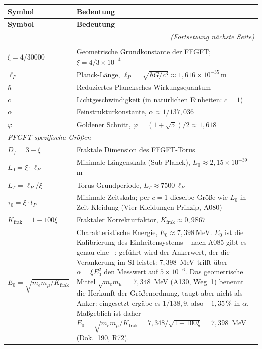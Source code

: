 \renewcommand{\arraystretch}{1.3}
{\small\setlength\tabcolsep{5pt}
\begin{longtable}{lp{\dimexpr\textwidth-3.2cm\relax}}
\toprule
\textbf{Symbol} & \textbf{Bedeutung} \\
\midrule
\endfirsthead
\toprule
\textbf{Symbol} & \textbf{Bedeutung} \\
\midrule
\endhead
\midrule
\multicolumn{2}{r}{\textit{(Fortsetzung nächste Seite)}} \\
\endfoot
\bottomrule
\endlastfoot
\multicolumn{2}{l}{\textit{Fundamentale Konstanten und Parameter}} \\
$\xi = 4/30000$ & Geometrische Grundkonstante der FFGFT;
  $\xi = 4/3\times10^{-4}$ \\
$\ell_P$ & Planck-Länge, $\ell_P = \sqrt{\hbar G/c^3}
  \approx 1{,}616\times10^{-35}\,$m \\
$\hbar$ & Reduziertes Plancksches Wirkungsquantum \\
$c$ & Lichtgeschwindigkeit (in natürlichen Einheiten: $c=1$) \\
$\alpha$ & Feinstrukturkonstante, $\alpha\approx1/137{,}036$ \\
$\varphi$ & Goldener Schnitt, $\varphi=(1+\sqrt5)/2\approx1{,}618$ \\
\midrule
\multicolumn{2}{l}{\textit{FFGFT-spezifische Größen}} \\
$D_f = 3-\xi$ & Fraktale Dimension des FFGFT-Torus \\
$L_0 = \xi\cdot\ell_P$ & Minimale Längenskala (Sub-Planck),
  $L_0\approx2{,}15\times10^{-39}\,$m \\
$L_T = \ell_P/\xi$ & Torus-Grundperiode, $L_T\approx7500\,\ell_P$ \\
$\tau_0 = \xi\cdot t_P$ & Minimale Zeitskala; per $c=1$ dieselbe Größe wie $L_0$
  in Zeit-Kleidung (Vier-Kleidungen-Prinzip, A080) \\
$K_\text{frak} = 1-100\xi$ & Fraktaler Korrekturfaktor,
  $K_\text{frak}\approx0{,}9867$ \\
$E_0 = \sqrt{m_e m_\mu/K_\text{frak}}$ & Charakteristische Energie,
  $E_0\approx7{,}398\,$MeV. $E_0$ ist die Kalibrierung des Einheitensystems -- nach A085 gibt es genau eine --; geführt wird der Ankerwert, der die Verankerung im SI leistet: $7{,}398$~MeV trifft über $\alpha = \xi E_0^2$ den Messwert auf $5\times10^{-6}$. Das geometrische Mittel $\sqrt{m_em_\mu} = 7{,}348$~MeV (A130, Weg~1) benennt die Herkunft der Größenordnung, taugt aber nicht als Anker: eingesetzt ergäbe es $1/138{,}9$, also $-1{,}35\,\%$ in $\alpha$. Maßgeblich ist daher $E_0 = \sqrt{m_em_\mu/K_\text{frak}} = 7{,}348/\sqrt{1-100\xi} = 7{,}398$~MeV (Dok.~190, R72). \\

\end{longtable}}
